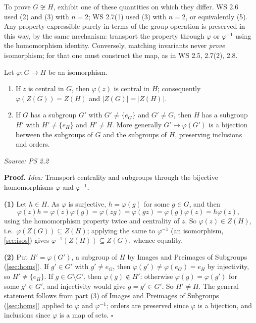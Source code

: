 \documentclass[11pt]{report}
\renewenvironment{proof}[1][Proof]{\noindent\textbf{#1.} }{\hfill$\square$\par\vspace{5pt}}
\newcommand{\srcline}[1]{\par\hfill{\footnotesize\textit{Source: #1}}}
\begin{document}
\begin{rembox}\label{rem:using-invariants}
To prove $G \not\cong H$, exhibit one of these quantities on which they differ. WS 2.6 used (2) and (3) with $n = 2$; WS 2.7(1) used (3) with $n = 2$, or equivalently (5). Any property expressible purely in terms of the group operation is preserved in this way, by the same mechanism: transport the property through $\varphi$ or $\varphi^{-1}$ using the homomorphism identity. Conversely, matching invariants never \emph{prove} isomorphism; for that one must construct the map, as in WS 2.5, 2.7(2), 2.8.
\end{rembox}

\begin{propbox}\label{prop:further-isomorphism-invariants}
Let $\varphi: G \to H$ be an isomorphism.
\begin{enumerate}
    \item If $z$ is central in $G$, then $\varphi(z)$ is central in $H$; consequently $\varphi(Z(G)) = Z(H)$ and $|Z(G)| = |Z(H)|$.
    \item If $G$ has a subgroup $G'$ with $G' \neq \{e_G\}$ and $G' \neq G$, then $H$ has a subgroup $H'$ with $H' \neq \{e_H\}$ and $H' \neq H$. More generally $G' \mapsto \varphi(G')$ is a bijection between the subgroups of $G$ and the subgroups of $H$, preserving inclusions and orders.
\end{enumerate}
\srcline{PS 2.2}
\end{propbox}

\begin{proof}
\textit{Idea:} Transport centrality and subgroups through the bijective homomorphisms $\varphi$ and $\varphi^{-1}$.\par
\textbf{(1)} Let $h \in H$. As $\varphi$ is surjective, $h = \varphi(g)$ for some $g \in G$, and then
\[ \varphi(z)h = \varphi(z)\varphi(g) = \varphi(zg) = \varphi(gz) = \varphi(g)\varphi(z) = h\varphi(z), \]
using the homomorphism property twice and centrality of $z$. So $\varphi(z) \in Z(H)$, i.e.\ $\varphi(Z(G)) \subseteq Z(H)$; applying the same to $\varphi^{-1}$ (an isomorphism, \ref{sec:isos}) gives $\varphi^{-1}(Z(H)) \subseteq Z(G)$, whence equality.

\textbf{(2)} Put $H' = \varphi(G')$, a subgroup of $H$ by Images and Preimages of Subgroups (\ref{sec:homs}). If $g' \in G'$ with $g' \neq e_G$, then $\varphi(g') \neq \varphi(e_G) = e_H$ by injectivity, so $H' \neq \{e_H\}$. If $g \in G \setminus G'$, then $\varphi(g) \notin H'$: otherwise $\varphi(g) = \varphi(g')$ for some $g' \in G'$, and injectivity would give $g = g' \in G'$. So $H' \neq H$. The general statement follows from part (3) of Images and Preimages of Subgroups (\ref{sec:homs}) applied to $\varphi$ and $\varphi^{-1}$; orders are preserved since $\varphi$ is a bijection, and inclusions since $\varphi$ is a map of sets.
\end{proof}
\end{document}
